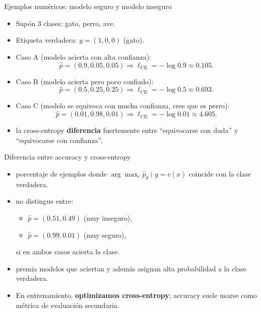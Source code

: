 \begin{frame}{Ejemplos numéricos: modelo seguro y modelo inseguro}
\begin{itemize}
  \item Supón 3 clases: gato, perro, ave.
  \item Etiqueta verdadera: \(y=(1,0,0)\) (gato).
  \item Caso A (modelo acierta con alta confianza):
  \[
    \hat p = (0.9,0.05,0.05)
    \Rightarrow \ell_{\mathrm{CE}} = -\log 0.9 \approx 0.105.
  \]
  \item Caso B (modelo acierta pero poco confiado):
  \[
    \hat p = (0.5,0.25,0.25)
    \Rightarrow \ell_{\mathrm{CE}} = -\log 0.5 \approx 0.693.
  \]
  \item Caso C (modelo se equivoca con mucha confianza, cree que es perro):
  \[
    \hat p = (0.01,0.98,0.01)
    \Rightarrow \ell_{\mathrm{CE}} = -\log 0.01 \approx 4.605.
  \]
  \item {} la cross-entropy \textbf{diferencia} fuertemente entre “equivocarse con duda” y “equivocarse con confianza”.
\end{itemize}
\end{frame}

\begin{frame}{Diferencia entre accuracy y cross-entropy}
\begin{itemize}
  \item {} porcentaje de ejemplos donde \(\arg\max_c \hat p_\theta(y=c\mid x)\) coincide con la clase verdadera.
  \item {} no distingue entre:
  \begin{itemize}
    \item \(\hat p = (0.51,0.49)\) (muy inseguro),
    \item \(\hat p = (0.99,0.01)\) (muy seguro),
  \end{itemize}
  si en ambos casos acierta la clase.
  \item {} premia modelos que aciertan y además asignan alta probabilidad a la clase verdadera.
  \item En entrenamiento, \textbf{optimizamos cross-entropy}; accuracy suele usarse como métrica de evaluación secundaria.
\end{itemize}
\end{frame}

